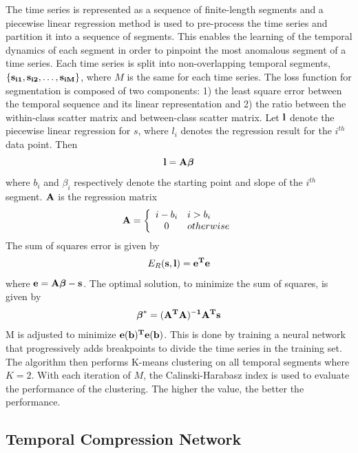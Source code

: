 \documentclass[twoside,twocolumn]{article}
\begin{document}
The time series is represented as a sequence of ﬁnite-length segments and a piecewise linear regression method is used to pre-process the time series and partition it into a sequence of segments.  This enables the learning of the temporal dynamics of each segment in order to pinpoint the most anomalous segment of a time series.  Each time series is split into non-overlapping temporal segments, $\{\bf{s}_{i1}, \bf{s}_{i2}, \dots, \bf{s}_{iM}\}$, where $M$ is the same for each time series.  The loss function for segmentation is composed of two components: 1) the least square error between the temporal sequence and its linear representation and 2) the ratio between the within-class scatter matrix and between-class scatter matrix. Let $\bf{l}$ denote the piecewise linear regression for $s$,  where $l_i$ denotes the regression result for the $i^{th}$ data point. Then 
\[
	\bf{l}=\bf{A}\boldsymbol{\beta}
	\label{linearRegressionTemporalSegmentation}
\]
where $b_i$ and $\beta_i$ respectively denote the starting point and slope of the $i^{th}$ segment.  $\bf{A}$ is the regression matrix
\begin{eqnarray}
	\bf{A}=\left\{ 
	\begin{array}{ c l }
		i-b_i & i>b_i \\
		0          & otherwise
	\end{array}
	\right.
	\label{regressionMatrix}
\end{eqnarray}
The sum of squares error is given by
\begin{eqnarray}
	E_R(\bf{s},\bf{l})=\bf{e}^T\bf{e}	
	\label{sumOfSquaresError}
\end{eqnarray}
where $\bf{e}=\bf{A}\boldsymbol{\beta}-\bf{s}$.  The optimal solution, to minimize the sum of squares, is given by
\begin{eqnarray}
	\boldsymbol{\beta}^*=(\bf{A}^T\bf{A})^{-1}\bf{A}^T\bf{s}
	\label{minSumOfSquaresError}
\end{eqnarray}
M is adjusted to minimize $\bf{e}(\bf{b})^T\bf{e}(\bf{b})$.  This is done by training a neural network that progressively adds breakpoints to divide the time series in the training set.  The algorithm then performs K-means clustering on all temporal segments where $K=2$.  With each iteration of $M$, the Calinski-Harabasz index is used to evaluate the performance of the clustering.  The higher the value, the better the performance.  

\subsection{Temporal Compression Network}
\end{document}
